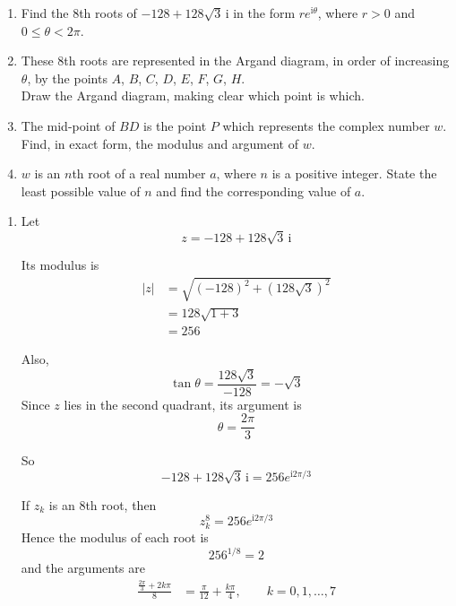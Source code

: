 \documentclass[leqno]{article}
\begin{document}
\begin{enumerate}[
  label=\textbf{\arabic*.},
  leftmargin=*,
  topsep=0pt,
  partopsep=0pt,
  parsep=0pt
]
\begin{enumerate}[label=(\roman*)]
  \item Find the $8$th roots of $-128+128\sqrt{3}\,\mathrm{i}$ in the form $re^{\mathrm{i}\theta}$, where $r>0$ and $0\leq \theta<2\pi$.  \\
  \item These $8$th roots are represented in the Argand diagram, in order of increasing $\theta$, by the points $A$, $B$, $C$, $D$, $E$, $F$, $G$, $H$. \\
  Draw the Argand diagram, making clear which point is which.  \\
  \item The mid-point of $BD$ is the point $P$ which represents the complex number $w$. \\
  Find, in exact form, the modulus and argument of $w$.  \\
  \item $w$ is an $n$th root of a real number $a$, where $n$ is a positive integer. State the least possible value of $n$ and find the corresponding value of $a$.  \\
\end{enumerate}

\vspace*{30pt}

\begin{tcolorbox}[colback=white, colframe=scarlet, title={\textbf{Solution}}, breakable, grow to left by=6mm, grow to right by=10mm]
\begin{enumerate}[label=\textbf{(\roman*)}]
\item Let
\[
z=-128+128\sqrt{3}\,\mathrm{i}
\]

Its modulus is
\begin{align*}
|z|
&=\sqrt{(-128)^2+(128\sqrt{3})^2} \\
&=128\sqrt{1+3} \\
&=256
\end{align*}

Also,
\[
\tan \theta=\frac{128\sqrt{3}}{-128}=-\sqrt{3}
\]
Since \(z\) lies in the second quadrant, its argument is
\[
\theta=\frac{2\pi}{3}
\]

So
\[
-128+128\sqrt{3}\,\mathrm{i}=256e^{\mathrm{i}2\pi/3}
\]

If \(z_k\) is an 8th root, then
\[
z_k^8=256e^{\mathrm{i}2\pi/3}
\]
Hence the modulus of each root is
\[
256^{1/8}=2
\]
and the arguments are
\begin{align*}
\frac{\frac{2\pi}{3}+2k\pi}{8}
&=\frac{\pi}{12}+\frac{k\pi}{4},
\qquad k=0,1,\ldots,7
\end{align*}


\end{enumerate}
\end{tcolorbox}
\end{enumerate}
\end{document}
